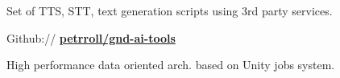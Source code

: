 \documentclass[a4paper]{deedy-resume} %
\begin{document}
\begin{minipage}[t]{0.62\textwidth}
\halfsectionspace %


\emptyLocation %
\begin{tightitemize}
\item Set of TTS, STT, text generation scripts using 3rd party services.
\item Github:// \href{https://github.com/petrroll/gnd-ai-tools}{\bf petrroll/gnd-ai-tools}
\end{tightitemize}

\halfsectionspace %


\emptyLocation %
\begin{tightitemize}
\item High performance data oriented arch. based on Unity jobs system.
\end{tightitemize}

\sectionspace %








\end{minipage}
\end{document}

